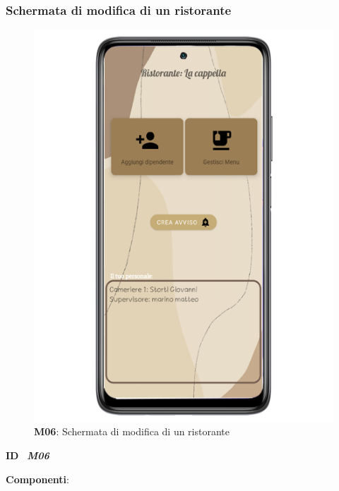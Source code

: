         \subsubsection{Schermata di modifica di un ristorante}
        \begin{figure}[H]
            \centering
            \includegraphics[scale=0.5]{assets/Mockup/Mockup_ResturantDash.png}
            \caption{\textbf{M06}: Schermata di modifica di un ristorante}\label{fig:Mockup_ResturantManager}
        \end{figure}
        \begin{flushleft}
            \textbf{ID} \ \Large{\textit{\textbf{M06}}}
        \end{flushleft}

        \textbf{Componenti}:

